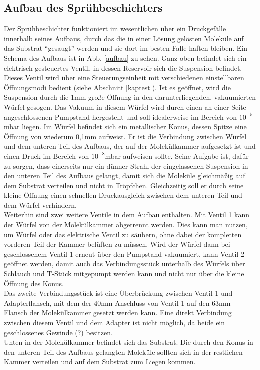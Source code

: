 \subsection{Aufbau des Sprühbeschichters}

Der Sprühbeschichter funktioniert im wesentlichen über ein Druckgefälle innerhalb seines Aufbaus, durch das
die in einer Lösung gelösten Moleküle auf das Substrat "`gesaugt"' werden und sie dort im besten
Falle haften bleiben. 
% 
Ein Schema des Aufbaus ist in Abb. \ref{aufbau} zu sehen. Ganz oben befindet sich ein elektrisch
gesteuertes Ventil, in dessen Reservoir sich die Suspension befindet. Dieses Ventil wird über eine
Steuerungseinheit mit verschiedenen einstellbaren Öffnungsmodi bedient (siehe Abschnitt \ref{kaptest}). Ist es
geöffnet, wird die Suspension durch die 1mm große Öffnung in den darunterliegenden, vakuumierten Würfel
gesogen. Das Vakuum in diesem Würfel wird durch einen an einer Seite angeschlossenen Pumpstand hergestellt
und soll idealerweise im Bereich von $10^{-5}$mbar liegen. Im Würfel befindet sich ein metallischer
Konus, dessen Spitze eine Öffnung von wiederum 0,1mm aufweist. Er ist die Verbindung zwischen Würfel und dem
unteren Teil des Aufbaus, der auf der Molekülkammer aufgesetzt ist und einen Druck im Bereich von
$10^{-8}$mbar aufweisen sollte.  
Seine Aufgabe ist, dafür zu sorgen, dass einerseits nur ein dünner Strahl der eingelassenen Suspension in
den unteren Teil des Aufbaus gelangt, damit sich die Moleküle gleichmäßig auf dem Substrat verteilen und
nicht in Tröpfchen. Gleichzeitig soll er durch seine kleine Öffnung einen schnellen Druckausgleich zwischen
dem unteren Teil und dem Würfel verhindern. \\
Weiterhin sind zwei weitere Ventile in dem Aufbau enthalten. Mit Ventil 1 kann der Würfel von der
Molekülkammer abgetrennt werden. Dies kann man nutzen, um Würfel oder das elektrische Ventil zu säubern, ohne
dabei der kompletten vorderen Teil der Kammer belüften zu müssen. Wird der Würfel dann bei geschlossenem
Ventil 1 erneut über den Pumpstand vakuumiert, kann Ventil 2 geöffnet werden, damit auch das Verbindungsstück
unterhalb des Würfels über Schlauch und T-Stück mitgepumpt werden kann und nicht nur über die kleine Öffnung
des Konus.\\
Das zweite Verbindungsstück ist eine Überbrückung zwischen Ventil 1 und Adapterflansch, mit dem
der 40mm-Anschluss von Ventil 1 %
auf den 63mm-Flansch der Molekülkammer gesetzt werden kann. Eine direkt Verbindung zwischen diesem
Ventil und dem Adapter ist nicht möglich, da beide ein geschlossenes Gewinde (?) besitzen.\\
Unten in der Molekülkammer befindet sich das Substrat. Die durch den Konus in den unteren Teil des Aufbaus
gelangten Moleküle sollten sich in der restlichen Kammer verteilen und auf dem Substrat zum Liegen kommen.

